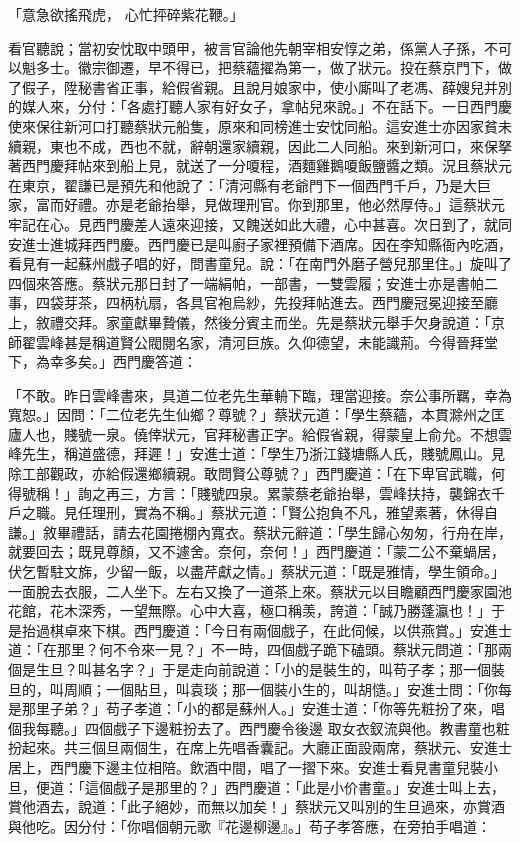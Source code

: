 「意急欲搖飛虎，  心忙抨碎紫花鞭。」

看官聽說；當初安忱取中頭甲，被言官論他先朝宰相安惇之弟，係黨人子孫，不可以魁多士。徽宗御遷，早不得已，把蔡蘊擢為第一，做了狀元。投在蔡京門下，做了假子，陞秘書省正事，給假省親。且說月娘家中，使小廝叫了老馮、薛嫂兒并別的媒人來，分付：「各處打聽人家有好女子，拿帖兒來說。」不在話下。一日西門慶使來保往新河口打聽蔡狀元船隻，原來和同榜進士安忱同船。這安進士亦因家貧未續親，東也不成，西也不就，辭朝還家續親，因此二人同船。來到新河口，來保拏著西門慶拜帖來到船上見，就送了一分嗄程，酒麵雞鵝嗄飯鹽醬之類。況且蔡狀元在東京，翟謙已是預先和他說了：「清河縣有老爺門下一個西門千戶，乃是大巨家，富而好禮。亦是老爺抬舉，見做理刑官。你到那里，他必然厚侍。」這蔡狀元牢記在心。見西門慶差人遠來迎接，又餽送如此大禮，心中甚喜。次日到了，就同安進士進城拜西門慶。西門慶已是叫廚子家裡預備下酒席。因在李知縣衙內吃酒，看見有一起蘇州戲子唱的好，問書童兒。說：「在南門外磨子營兒那里住。」旋叫了四個來答應。蔡狀元那日封了一端絹帕，一部書，一雙雲履；安進士亦是書帕二事，四袋芽茶，四柄杭扇，各具官袍烏紗，先投拜帖進去。西門慶冠冕迎接至廳上，敘禮交拜。家童獻畢贄儀，然後分賓主而坐。先是蔡狀元舉手欠身說道：「京師翟雲峰甚是稱道賢公閥閱名家，清河巨族。久仰德望，未能識荊。今得晉拜堂下，為幸多矣。」西門慶答道：

「不敢。昨日雲峰書來，具道二位老先生華輈下臨，理當迎接。奈公事所羈，幸為寬恕。」因問：「二位老先生仙鄉？尊號？」蔡狀元道：「學生蔡蘊，本貫滁州之匡廬人也，賤號一泉。僥倖狀元，官拜秘書正字。給假省親，得蒙皇上俞允。不想雲峰先生，稱道盛德，拜遲！」安進士道：「學生乃浙江錢塘縣人氏，賤號鳳山。見除工部觀政，亦給假還鄉續親。敢問賢公尊號？」西門慶道：「在下卑官武職，何得號稱！」詢之再三，方言：「賤號四泉。累蒙蔡老爺抬舉，雲峰扶持，襲錦衣千戶之職。見任理刑，實為不稱。」蔡狀元道：「賢公抱負不凡，雅望素著，休得自謙。」敘畢禮話，請去花園捲棚內寬衣。蔡狀元辭道：「學生歸心匆匆，行舟在岸，就要回去；既見尊顏，又不遽舍。奈何，奈何！」西門慶道：「蒙二公不棄蝸居，伏乞暫駐文旆，少留一飯，以盡芹獻之情。」蔡狀元道：「既是雅情，學生領命。」一面脫去衣服，二人坐下。左右又換了一道茶上來。蔡狀元以目瞻顧西門慶家園池花館，花木深秀，一望無際。心中大喜，極口稱羡，誇道：「誠乃勝蓬瀛也！」于是抬過棋卓來下棋。西門慶道：「今日有兩個戲子，在此伺候，以供燕賞。」安進士道：「在那里？何不令來一見？」不一時，四個戲子跪下磕頭。蔡狀元問道：「那兩個是生旦？叫甚名字？」于是走向前說道：「小的是裝生的，叫苟子孝；那一個裝旦的，叫周順；一個貼旦，叫袁琰；那一個裝小生的，叫胡慥。」安進士問：「你每是那里子弟？」苟子孝道：「小的都是蘇州人。」安進士道：「你等先粧扮了來，唱個我每聽。」四個戲子下邊粧扮去了。西門慶令後邊 取女衣釵流與他。教書童也粧扮起來。共三個旦兩個生，在席上先唱香囊記。大廳正面設兩席，蔡狀元、安進士居上，西門慶下邊主位相陪。飲酒中間，唱了一摺下來。安進士看見書童兒裝小旦，便道：「這個戲子是那里的？」西門慶道：「此是小价書童。」安進士叫上去，賞他酒去，說道：「此子絕妙，而無以加矣！」蔡狀元又叫別的生旦過來，亦賞酒與他吃。因分付：「你唱個朝元歌『花邊柳邊』。」苟子孝答應，在旁拍手唱道：

